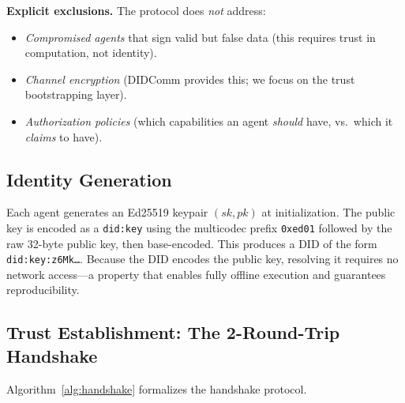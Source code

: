 \documentclass[11pt]{article}
\newcommand{\didkey}{\texttt{did:key}}
\begin{document}
\noindent\textbf{Explicit exclusions.} The protocol does \emph{not} address:
\begin{itemize}[nosep,leftmargin=1.5em]
  \item \emph{Compromised agents} that sign valid but false data (this requires trust in computation, not identity).
  \item \emph{Channel encryption} (DIDComm provides this; we focus on the trust bootstrapping layer).
  \item \emph{Authorization policies} (which capabilities an agent \emph{should} have, vs.\ which it \emph{claims} to have).
\end{itemize}

\subsection{Identity Generation}

Each agent generates an Ed25519 keypair $(sk, pk)$ at initialization. The public key is encoded as a \didkey{} using the multicodec prefix \texttt{0xed01} followed by the raw 32-byte public key, then base-encoded. This produces a DID of the form \texttt{did:key:z6Mk\ldots}. Because the DID encodes the public key, resolving it requires no network access---a property that enables fully offline execution and guarantees reproducibility.

\subsection{Trust Establishment: The 2-Round-Trip Handshake}

Algorithm~\ref{alg:handshake} formalizes the handshake protocol.
\end{document}
